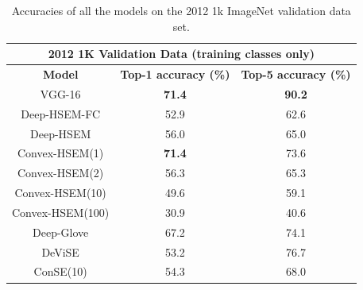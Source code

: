 \documentclass[12pt]{report}
\begin{document}
\begin{table}
\centering
\begin{tabular}{@{}ccc@{}}
\toprule
\multicolumn{3}{c}{\textbf{2012 1K Validation Data (training classes only)}}                                                                        \\ \midrule
\multicolumn{1}{c}{\textbf{Model}}          & \multicolumn{1}{c}{\textbf{Top-1 accuracy (\%)}} & \multicolumn{1}{c}{\textbf{Top-5 accuracy (\%)}} \\ \midrule
\multicolumn{1}{c}{VGG-16}                  & \multicolumn{1}{c}{\textbf{71.4}}               & \multicolumn{1}{c}{\textbf{90.2}}                        \\
\multicolumn{1}{c}{Deep-HSEM-FC}            & \multicolumn{1}{c}{52.9}                        & \multicolumn{1}{c}{62.6}                        \\
\multicolumn{1}{c}{Deep-HSEM}               & \multicolumn{1}{c}{56.0}                        & \multicolumn{1}{c}{65.0}                        \\
\multicolumn{1}{c}{Convex-HSEM(1)}          & \multicolumn{1}{c}{\textbf{71.4}}              & \multicolumn{1}{c}{73.6}                        \\
\multicolumn{1}{c}{Convex-HSEM(2)}          & \multicolumn{1}{c}{56.3}                        & \multicolumn{1}{c}{65.3}                        \\
\multicolumn{1}{c}{Convex-HSEM(10)}         & \multicolumn{1}{c}{49.6}                        & \multicolumn{1}{c}{59.1}                        \\
\multicolumn{1}{c}{Convex-HSEM(100)}        & \multicolumn{1}{c}{30.9}                        & \multicolumn{1}{c}{40.6}                        \\
\multicolumn{1}{c}{Deep-Glove}              & \multicolumn{1}{c}{67.2}                        & \multicolumn{1}{c}{74.1}                        \\
\multicolumn{1}{c}{DeViSE \cite{Frome2013}} & \multicolumn{1}{c}{53.2}                        & \multicolumn{1}{c}{76.7}                        \\
\multicolumn{1}{c}{ConSE(10) \cite{Norouzi2013}}  & \multicolumn{1}{c}{54.3}                  & \multicolumn{1}{c}{68.0}                        \\ 
\bottomrule
\end{tabular}
\caption{Accuracies of all the models on the 2012 1k ImageNet validation data set.}
\label{tbl:train}
\end{table}
\end{document}
